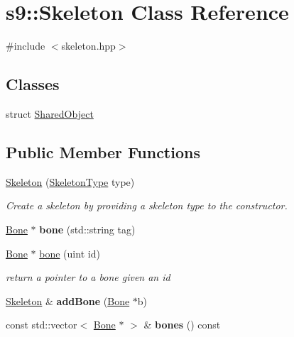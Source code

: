 \hypertarget{classs9_1_1Skeleton}{\section{s9\-:\-:Skeleton Class Reference}
\label{classs9_1_1Skeleton}
}


{\ttfamily \#include $<$skeleton.\-hpp$>$}

\subsection*{Classes}
\begin{DoxyCompactItemize}
\item 
struct \hyperlink{structs9_1_1Skeleton_1_1SharedObject}{Shared\-Object}
\end{DoxyCompactItemize}
\subsection*{Public Member Functions}
\begin{DoxyCompactItemize}
\item 
\hypertarget{classs9_1_1Skeleton_af74087f5bac7c441193c93a3532f253f}{\hyperlink{classs9_1_1Skeleton_af74087f5bac7c441193c93a3532f253f}{Skeleton} (\hyperlink{namespaces9_a4b242c485a2df431daccfd4a6876cc11}{Skeleton\-Type} type)}\label{classs9_1_1Skeleton_af74087f5bac7c441193c93a3532f253f}

\begin{DoxyCompactList}\small\item\em Create a skeleton by providing a skeleton type to the constructor. \end{DoxyCompactList}\item 
\hypertarget{classs9_1_1Skeleton_a85c1b7775ec831c7beec7cd0b62847fb}{\hyperlink{structs9_1_1Bone}{Bone} $\ast$ {\bfseries bone} (std\-::string tag)}\label{classs9_1_1Skeleton_a85c1b7775ec831c7beec7cd0b62847fb}

\item 
\hypertarget{classs9_1_1Skeleton_a6036694a2651250b94e3ea512ff1898b}{\hyperlink{structs9_1_1Bone}{Bone} $\ast$ \hyperlink{classs9_1_1Skeleton_a6036694a2651250b94e3ea512ff1898b}{bone} (uint id)}\label{classs9_1_1Skeleton_a6036694a2651250b94e3ea512ff1898b}

\begin{DoxyCompactList}\small\item\em return a pointer to a bone given an id \end{DoxyCompactList}\item 
\hypertarget{classs9_1_1Skeleton_a91d7470a0cae2f614a26077450178817}{\hyperlink{classs9_1_1Skeleton}{Skeleton} \& {\bfseries add\-Bone} (\hyperlink{structs9_1_1Bone}{Bone} $\ast$b)}\label{classs9_1_1Skeleton_a91d7470a0cae2f614a26077450178817}

\item 
\hypertarget{classs9_1_1Skeleton_a0144fa694f1dcb0a1e7cd2bc4bf699ed}{const std\-::vector$<$ \hyperlink{structs9_1_1Bone}{Bone} $\ast$ $>$ \& {\bfseries bones} () const }\label{classs9_1_1Skeleton_a0144fa694f1dcb0a1e7cd2bc4bf699ed}

\end{DoxyCompactItemize}
